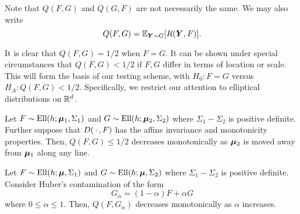Note that $Q(F, G)$ and $Q(G, F)$ are not necessarily the same.
We may also write
\begin{equation}
    Q(F, G) = \operatorname{\mathbb{E}}_{\bm{Y} \sim G}[R(\bm{Y}, F)].
\end{equation}


It is clear that $Q(F, G) = 1/2$ when $F = G$.
It can be shown under special circumstances that $Q(F, G) < 1/2$ if $F, G$
differ in terms of location or scale.
This will form the basis of our testing scheme, with $H_0: F = G$ versus $H_A:
Q(F, G) < 1/2$.
Specifically, we restrict our attention to elliptical distributions on $\mathbb{R}^d$.




\begin{proposition}
    Let $F \sim \operatorname{Ell}(h; \bm{\mu}_1, \Sigma_1)$ and $G \sim \operatorname{Ell}(h; \bm{\mu}_2,
    \Sigma_2)$ where $\Sigma_1 - \Sigma_2$ is positive definite.
    Further suppose that $D(\,\cdot\,, F)$ has the affine invariance and
    monotonicity properties.
    Then, $Q(F, G) \leq 1/2$ decreases monotonically as $\bm{\mu}_2$ is moved away
    from $\bm{\mu}_1$ along any line.
\end{proposition}

\begin{proposition}
    Let $F \sim \operatorname{Ell}(h; \bm{\mu}, \Sigma_1)$ and $G \sim \operatorname{Ell}(h; \bm{\mu},
    \Sigma_2)$ where $\Sigma_1 - \Sigma_2$ is positive definite.
    Consider Huber's contamination of the form
    \begin{equation}
        G_\alpha = (1 - \alpha)F + \alpha G
    \end{equation}
    where $0 \leq \alpha \leq 1$.
    Then, $Q(F, G_\alpha)$ decreases monotonically as $\alpha$ increases.
\end{proposition}

